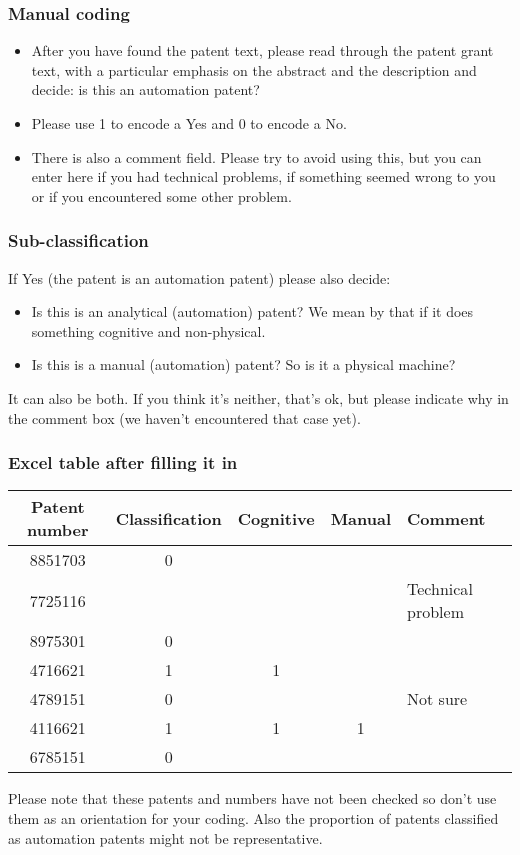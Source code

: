 \documentclass[10pt]{beamer}
\begin{document}
\begin{frame}\frametitle{Manual coding}
	\begin{itemize}	
	\item After you have found the patent text, please read through the patent grant text, with a particular emphasis on the abstract and the description and decide: is this an automation patent?
	\item Please use 1 to encode a Yes and 0 to encode a No.
	\item There is also a comment field. Please try to avoid using this, but you can enter here if you had technical problems, if something seemed wrong to you or if you encountered some other problem.
	\end{itemize}
\end{frame}


\begin{frame}\frametitle{Sub-classification}
If Yes (the patent is an automation patent) please also decide:
	\begin{itemize}
	\item Is this is an analytical (automation) patent? We mean by that if it does something cognitive and non-physical.
	\item Is this is a manual (automation) patent? So is it a physical machine?
	\end{itemize}
It can also be both. If you think it's neither, that's ok, but please indicate why in the comment box (we haven't encountered that case yet).
\end{frame}


\begin{frame}\frametitle{Excel table after filling it in}
\vspace{-1cm}
\begin{table}
\begin{small}
  \begin{threeparttable}
     \begin{tabular}{ccccl}
        \textbf{Patent number} & \textbf{Classification} & \textbf{Cognitive} & \textbf{Manual} & \textbf{Comment}  \tabularnewline
        \hline
        8851703	& 0  &  &  &	\tabularnewline
        7725116 & 	 &  &  &	Technical problem\tabularnewline
        8975301 & 0	 &  &  &	\tabularnewline
        4716621 & 1	 & 1 &  &	\tabularnewline
        4789151 & 0	 &  &  & 	Not sure\tabularnewline
        4116621 & 1	 & 1 & 1 &	\tabularnewline
        6785151 & 0	 &  &  & 	\tabularnewline
        \hline
     \end{tabular}
  \end{threeparttable}
\end{small}
\end{table}
\vspace{0.5cm}
{\small \textcolor{mytextgrey}{Please note that these patents and numbers have not been checked so don't use them as an orientation for your coding. Also the proportion of patents classified as automation patents might not be representative.} }

\end{frame}
\end{document}
